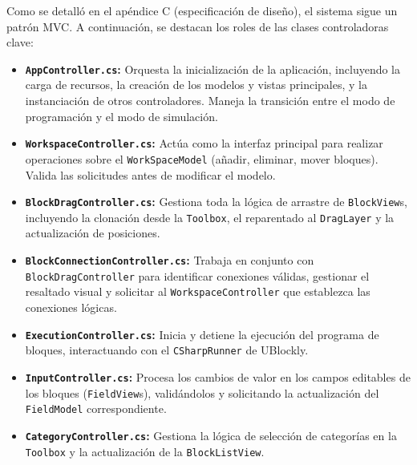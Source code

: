 Como se detalló en el apéndice C (especificación de diseño), el sistema sigue un patrón MVC. A continuación, se destacan los roles de las clases controladoras clave:
\begin{itemize}
	\item \textbf{\texttt{AppController.cs}:} Orquesta la inicialización de la aplicación, incluyendo la carga de recursos, la creación de los modelos y vistas principales, y la instanciación de otros controladores. Maneja la transición entre el modo de programación y el modo de simulación.
	\item \textbf{\texttt{WorkspaceController.cs}:} Actúa como la interfaz principal para realizar operaciones sobre el \texttt{WorkSpaceModel} (añadir, eliminar, mover bloques). Valida las solicitudes antes de modificar el modelo.
	\item \textbf{\texttt{BlockDragController.cs}:} Gestiona toda la lógica de arrastre de \texttt{BlockView}s, incluyendo la clonación desde la \texttt{Toolbox}, el reparentado al \texttt{DragLayer} y la actualización de posiciones.
	\item \textbf{\texttt{BlockConnectionController.cs}:} Trabaja en conjunto con \texttt{BlockDragController} para identificar conexiones válidas, gestionar el resaltado visual y solicitar al \texttt{WorkspaceController} que establezca las conexiones lógicas.
	\item \textbf{\texttt{ExecutionController.cs}:} Inicia y detiene la ejecución del programa de bloques, interactuando con el \texttt{CSharpRunner} de UBlockly.
	\item \textbf{\texttt{InputController.cs}:} Procesa los cambios de valor en los campos editables de los bloques (\texttt{FieldView}s), validándolos y solicitando la actualización del \texttt{FieldModel} correspondiente.
	\item \textbf{\texttt{CategoryController.cs}:} Gestiona la lógica de selección de categorías en la \texttt{Toolbox} y la actualización de la \texttt{BlockListView}.
\end{itemize}

